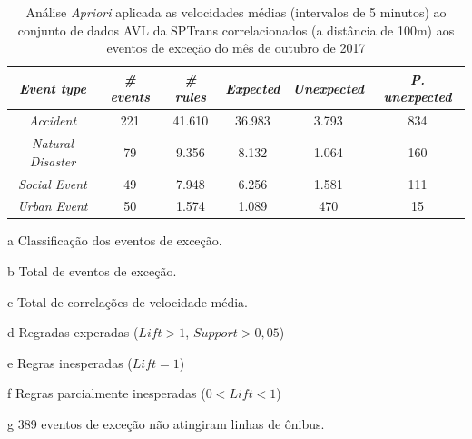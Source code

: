\documentclass[
	12pt,				%
	oneside,			%
	a4paper,			%
	english,			%
	brazil				%
	]{abntex2ppgsi}
\begin{document}
\begin{apendicesenv}
\begin{table}[!htb]
\centering
\begin{threeparttable}
\caption {Análise \textit{Apriori} aplicada as velocidades médias (intervalos de 5 minutos) ao conjunto de dados AVL da SPTrans correlacionados (a distância de 100m) aos eventos de exceção do mês de outubro de 2017}
\label {tab:aprioriFull}
\begin{tabular}{c|c|c|c|c|c}
\hline
\textbf{\textit{Event type}}\tnote{a} & \textbf{\textit{\# events}}\tnote{b} & \textit{\textbf{\# rules}}\tnote{c} & \textbf{\textit{Expected}}\tnote{d} & \textbf{\textit{Unexpected}}\tnote{e} & \textbf{\textit{P. unexpected}}\tnote{f}   \\
\hline
\textit{Accident} & 221 & 41.610 & 36.983 & 3.793 & 834 \\
\textit{Natural Disaster} & 79 & 9.356 & 8.132 & 1.064 & 160 \\
\textit{Social Event} & 49 & 7.948 & 6.256 & 1.581 & 111 \\
\textit{Urban Event} & 50 & 1.574 & 1.089 & 470 & 15 \\
\hline
\end{tabular}
\begin{tablenotes}
            \item[a] Classificação dos eventos de exceção.
            \item[b] Total de eventos de exceção.
            \item[c] Total de correlações de velocidade média.
            \item[d] Regradas experadas ($Lift > 1$, $Support > 0,05$)
            \item[e] Regras inesperadas ($Lift = 1$)
            \item[f] Regras parcialmente inesperadas ($0 < Lift < 1$)
            \item[g] 389 eventos de exceção não atingiram linhas de ônibus.
        \end{tablenotes}
\end{threeparttable}
\end{table}


\end{apendicesenv}
\end{document}
